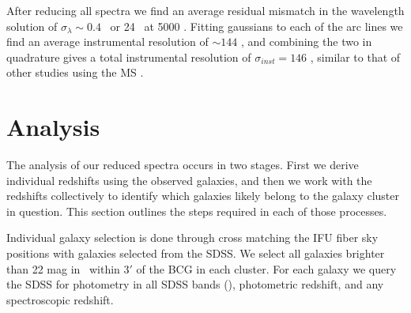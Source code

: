 
After reducing all spectra we find an average residual mismatch in the wavelength solution of $\sigma_\lambda \sim 0.4$ \AAA\ or 24 \kms\ at 5000 \AAA. Fitting gaussians to each of the arc lines we find an average instrumental resolution of $\sim144$ \kms, and combining the two in quadrature gives a total instrumental resolution of $\sigma_{inst} = 146$ \kms, similar to that of other studies using the MS .

\section{Analysis}\label{2sec:analysis} 
The analysis of our reduced spectra occurs in two stages. First we derive individual redshifts using the observed galaxies, and then we work with the redshifts collectively to identify which galaxies likely belong to the galaxy cluster in question. This section outlines the steps required in each of those processes. 

Individual galaxy selection is done through cross matching the IFU fiber sky positions with galaxies selected from the SDSS. We select all galaxies brighter than 22 mag in \sdssg\ within $3'$ of the BCG in each cluster. For each galaxy we query the SDSS for photometry in all SDSS bands (\sdssu\sdssg\sdssr\sdssi\sdssz), photometric redshift, and any spectroscopic redshift. 

